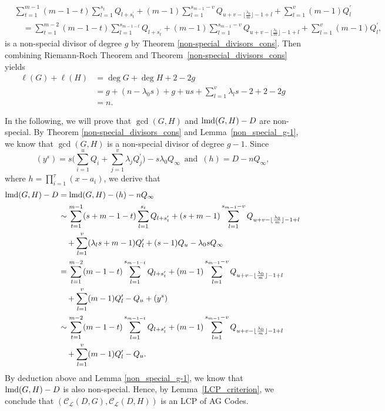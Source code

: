 \documentclass[journal,12pt,onecolumn]{IEEEtran}
\begin{document}
    \begin{align*}
        &\sum_{t=1}^{m-1}(m-1-t)\sum_{l=1}^{s_t}Q_{l+s_t^\prime} + (m-1)\sum_{l=1}^{s_{m-1}-v}Q_{u+v-\lfloor\frac{\lambda_0}{m}\rfloor-1+l} + \sum_{l=1}^{v}(m-1)Q^\prime_l \\
        &\quad = \sum_{t=1}^{m-2}(m-1-t)\sum_{l=1}^{s_{m-1-t}}Q_{l+s_t^\prime} + (m-1)\sum_{l=1}^{s_{m-1}-v}Q_{u+v-\lfloor\frac{\lambda_0}{m}\rfloor-1+l} + \sum_{l=1}^{v}(m-1)Q^\prime_l, 
    \end{align*}
    is a non-special divisor of degree $g$ by Theorem \ref{non-special_divisors_cons}. Then combining Riemann-Roch Theorem and Theorem~\ref{non-special_divisors_cons} yields
        \begin{align*}
            \ell(G)+\ell(H)&=\deg G + \deg H +2-2g\\
            &=g+(n-\lambda_0s) + g + us + \sum_{l=1}^v\lambda_l s - 2 +2 -2g \\
            &= n .
        \end{align*}
    
    In the following, we will prove that $\gcd(G,H)$ and ${\rm lmd}(G,H)-D$ are non-special. By Theorem \ref{non-special_divisors_cons} and Lemma~\ref{non_special_g-1}, we know that $\gcd(G,H)$ is a non-special divisor of degree $g-1$. Since 
    \[
        (y^s) = s\bigg(\sum_{i=1}^uQ_i+\sum_{j=1}^v\lambda_jQ_j^\prime\bigg)-s\lambda_0Q_\infty\,\text{ and }\,(h)=D-nQ_\infty,
    \]
    where $h=\prod_{i=1}^\tau(x-a_i)$, we derive that
    \begin{align*}
        {\rm lmd}(G,H)-D & = {\rm lmd}(G,H)-(h)-nQ_\infty\\
        &\sim \sum_{t=1}^{m-1}(s+m-1-t)\sum_{l=1}^{s_t}Q_{l+s_t^\prime} + (s+m-1)\sum_{l=1}^{s_{m-1}-v}Q_{u+v-\lfloor\frac{\lambda_0}{m}\rfloor-1+l}\\ 
        &\quad +\sum_{l=1}^{v}(\lambda_l s+m-1)Q^\prime_l + (s-1)Q_u-\lambda_0sQ_\infty\\
        & = \sum_{t=1}^{m-2}(m-1-t)\sum_{l=1}^{s_{m-1-t}}Q_{l+s_t^\prime} + (m-1)\sum_{l=1}^{s_{m-1}-v}Q_{u+v-\lfloor\frac{\lambda_0}{m}\rfloor-1+l}\\ 
        &\quad +\sum_{l=1}^{v}(m-1)Q^\prime_l -Q_u + (y^s)\\
        & \sim \sum_{t=1}^{m-2}(m-1-t)\sum_{l=1}^{s_{m-1-t}}Q_{l+s_t^\prime} + (m-1)\sum_{l=1}^{s_{m-1}-v}Q_{u+v-\lfloor\frac{\lambda_0}{m}\rfloor-1+l}\\ 
        &\quad +\sum_{l=1}^{v}(m-1)Q^\prime_l -Q_u. 
    \end{align*}
    By deduction above and Lemma \ref{non_special_g-1}, we know that ${\rm lmd}(G,H)-D$ is also non-special. Hence, by Lemma~\ref{LCP_criterion}, we conclude that $(\mathcal{C}_{\mathcal{L}}(D,G),\mathcal{C}_{\mathcal{L}}(D,H))$ is an LCP of AG Codes. 
\end{document}
